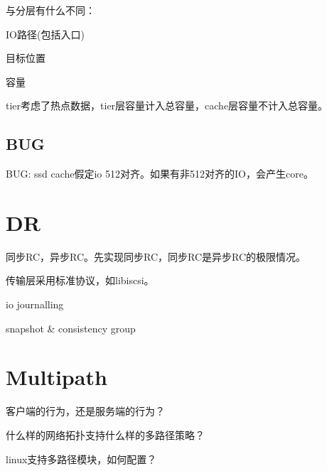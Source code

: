 与分层有什么不同：
\begin{compactitem}
\item IO路径(包括入口)
\item 目标位置
\item 容量
\end{compactitem}

tier考虑了热点数据，tier层容量计入总容量，cache层容量不计入总容量。

\subsection{BUG}

BUG: ssd cache假定io 512对齐。如果有非512对齐的IO，会产生core。

\section{DR}

同步RC，异步RC。先实现同步RC，同步RC是异步RC的极限情况。

传输层采用标准协议，如libiscsi。

io journalling

snapshot \& consistency group


\section{Multipath}

\begin{enumbox}
\item 客户端的行为，还是服务端的行为？
\item 什么样的网络拓扑支持什么样的多路径策略？
\item linux支持多路径模块，如何配置？
\end{enumbox}
